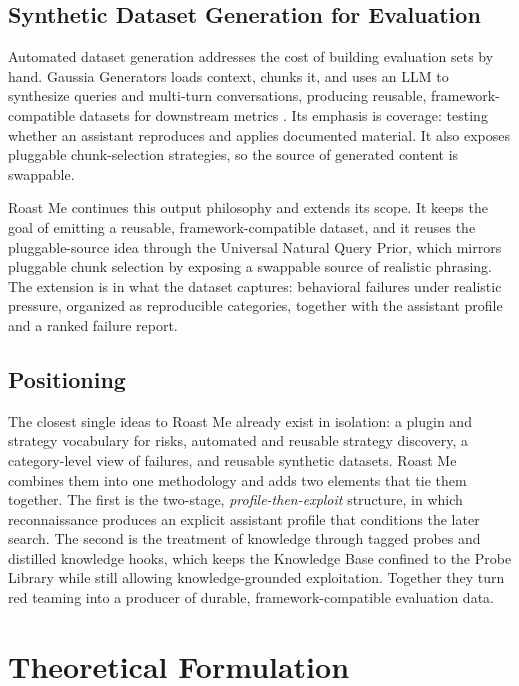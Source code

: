 \documentclass[11pt,a4paper]{article}
\begin{document}
\subsection{Synthetic Dataset Generation for Evaluation}

Automated dataset generation addresses the cost of building evaluation sets by
hand. Gaussia Generators loads context, chunks it, and uses an LLM to synthesize
queries and multi-turn conversations, producing reusable, framework-compatible
datasets for downstream metrics \citep{gaussia-generators}. Its emphasis is
coverage: testing whether an assistant reproduces and applies documented
material. It also exposes pluggable chunk-selection strategies, so the source of
generated content is swappable.

Roast Me continues this output philosophy and extends its scope. It keeps the
goal of emitting a reusable, framework-compatible dataset, and it reuses the
pluggable-source idea through the Universal Natural Query Prior, which mirrors
pluggable chunk selection by exposing a swappable source of realistic phrasing.
The extension is in what the dataset captures: behavioral failures under
realistic pressure, organized as reproducible categories, together with the
assistant profile and a ranked failure report.

\subsection{Positioning}

The closest single ideas to Roast Me already exist in isolation: a plugin and
strategy vocabulary for risks, automated and reusable strategy discovery, a
category-level view of failures, and reusable synthetic datasets. Roast Me combines them into one methodology and adds two
elements that tie them together. The first is the two-stage,
\emph{profile-then-exploit} structure, in which reconnaissance produces an
explicit assistant profile that conditions the later search. The second is the
treatment of knowledge through tagged probes and distilled knowledge hooks, which
keeps the Knowledge Base confined to the Probe Library while still allowing
knowledge-grounded exploitation. Together they turn red teaming into a producer
of durable, framework-compatible evaluation data.

\section{Theoretical Formulation}
\label{sec:theory}
\end{document}

